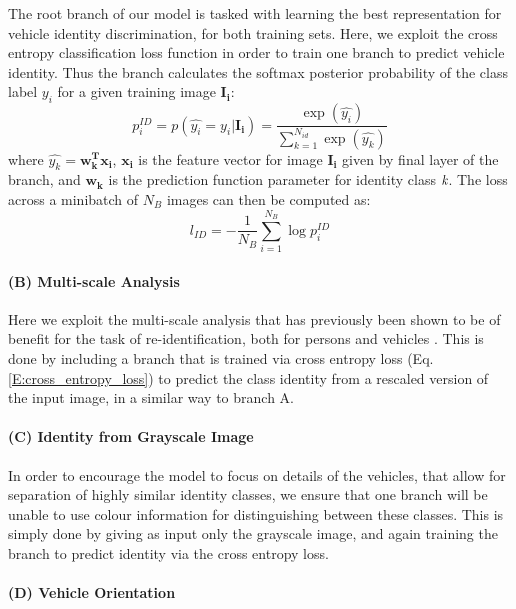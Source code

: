 \documentclass[10pt,twocolumn,letterpaper]{article}
\begin{document}
The root branch of our model is tasked with learning the best representation for vehicle identity discrimination, for both training sets. Here, we exploit the cross entropy classification loss function in order to train one branch to predict vehicle identity. Thus the branch calculates the softmax posterior probability of the class label $y_i$ for a given training image $\mathbf{I_i}$:
\begin{equation}
  p_i^{ID} = p(\hat{y_i} = y_i|\mathbf{I_i}) = \frac{\exp(\hat{y_i})}{\sum_{k=1}^{N_{id}}\exp(\hat{y_k})}
  \label{E:softmax_id}
\end{equation}
where $\hat{y_k} = \mathbf{w_k^Tx_i}$, $\mathbf{x_i}$ is the feature vector for image $\mathbf{I_i}$ given by final layer of the branch, and $\mathbf{w_k}$ is the prediction function parameter for identity class $\emph{k}$. The loss across a minibatch of $N_B$ images can then be computed as:
\begin{equation}
  l_{ID} = -\frac{1}{N_B} \sum_{i=1}^{N_B} \log{p_i^{ID}}
  \label{E:cross_entropy_loss}
\end{equation}

\paragraph{(B) Multi-scale Analysis}

Here we exploit the multi-scale analysis that has previously been shown to be of benefit for the task of re-identification, both for persons \cite{chen2017person} and vehicles \cite{kanaci2018vehicle}. This is done by including a branch that is trained via cross entropy loss (Eq. \ref{E:cross_entropy_loss}) to predict the class identity from a rescaled version of the input image, in a similar way to branch A.

\paragraph{(C) Identity from Grayscale Image}

In order to encourage the model to focus on details of the vehicles, that allow for separation of highly similar identity classes, we ensure that one branch will be unable to use colour information for distinguishing between these classes. This is simply done by giving as input only the grayscale image, and again training the branch to predict identity via the cross entropy loss.

\paragraph{(D) Vehicle Orientation}
\end{document}
